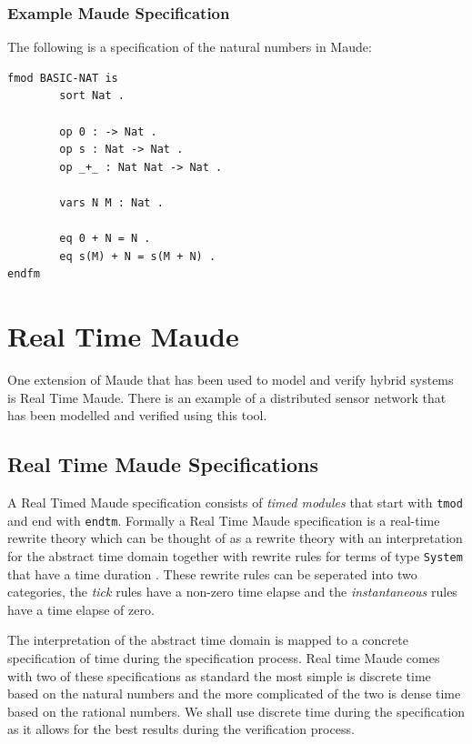 \begin{mydef}


\end{mydef}

\subsubsection{Example Maude Specification}
The following is a specification of the natural numbers in Maude:

\begin{verbatim}
fmod BASIC-NAT is
        sort Nat .

        op 0 : -> Nat .
        op s : Nat -> Nat .
        op _+_ : Nat Nat -> Nat .

        vars N M : Nat .

        eq 0 + N = N .
        eq s(M) + N = s(M + N) .
endfm
\end{verbatim}



\section{Real Time Maude}
One extension of Maude that has been used to model and verify hybrid systems is Real Time Maude. There is an example of a distributed sensor network that has been modelled and verified using this tool.
\subsection{Real Time Maude Specifications}
A Real Timed Maude specification consists of \emph{timed modules} that start with \texttt{tmod} and end with \texttt{endtm}. Formally a Real Time Maude specification is a real-time rewrite theory which can be thought of as a rewrite theory with an interpretation for the abstract time domain together with rewrite rules for terms of type \texttt{System} that have a time duration \cite{PO02}. These rewrite rules can be seperated into two categories, the \emph{tick} rules have a non-zero time elapse and the \emph{instantaneous} rules have a time elapse of zero.

The interpretation of the abstract time domain is mapped to a concrete specification of time during the specification process. Real time Maude comes with two of these specifications as standard the most simple  is discrete time based on the natural numbers and the more complicated of the two is dense time based on the rational numbers. We shall use discrete time during the specification as it allows for the best results during the verification process.

